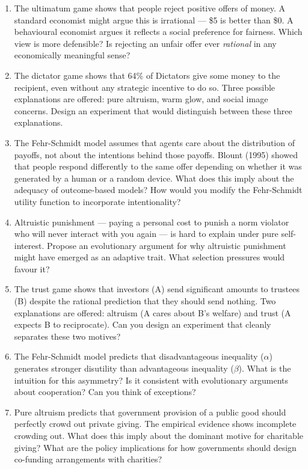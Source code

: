 \documentclass[12pt, letterpaper]{article}
\begin{document}
\begin{enumerate}
\item The ultimatum game shows that people reject positive offers of money. A standard economist might argue this is irrational --- \$5 is better than \$0. A behavioural economist argues it reflects a social preference for fairness. Which view is more defensible? Is rejecting an unfair offer ever \textit{rational} in any economically meaningful sense?

\item The dictator game shows that 64\% of Dictators give some money to the recipient, even without any strategic incentive to do so. Three possible explanations are offered: pure altruism, warm glow, and social image concerns. Design an experiment that would distinguish between these three explanations.

\item The Fehr-Schmidt model assumes that agents care about the distribution of payoffs, not about the intentions behind those payoffs. Blount (1995) showed that people respond differently to the same offer depending on whether it was generated by a human or a random device. What does this imply about the adequacy of outcome-based models? How would you modify the Fehr-Schmidt utility function to incorporate intentionality?

\item Altruistic punishment --- paying a personal cost to punish a norm violator who will never interact with you again --- is hard to explain under pure self-interest. Propose an evolutionary argument for why altruistic punishment might have emerged as an adaptive trait. What selection pressures would favour it?


\item The trust game shows that investors (A) send significant amounts to trustees (B) despite the rational prediction that they should send nothing. Two explanations are offered: altruism (A cares about B's welfare) and trust (A expects B to reciprocate). Can you design an experiment that cleanly separates these two motives?

\item The Fehr-Schmidt model predicts that disadvantageous inequality ($\alpha$) generates stronger disutility than advantageous inequality ($\beta$). What is the intuition for this asymmetry? Is it consistent with evolutionary arguments about cooperation? Can you think of exceptions?

\item Pure altruism predicts that government provision of a public good should perfectly crowd out private giving. The empirical evidence shows incomplete crowding out. What does this imply about the dominant motive for charitable giving? What are the policy implications for how governments should design co-funding arrangements with charities?


\end{enumerate}
\end{document}
